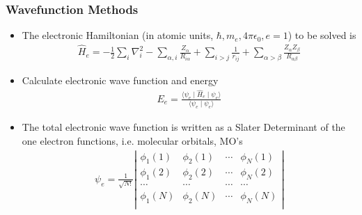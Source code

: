 \documentclass[slidestop,mathserif,compress,xcolor=svgnames]{beamer}
\begin{document}
\begin{frame}
  \frametitle{\small Wavefunction Methods}
  \begin{block}{}
    \begin{itemize}
      \item The electronic Hamiltonian (in atomic units, $\hbar,m_e,4\pi\epsilon_0,e=1$) to be solved is 
      \begin{align*}
	\hat{H}_e = -\frac{1}{2}\sum_i\nabla^2_i - \sum_{\alpha,i}\frac{Z_\alpha}{R_{i\alpha}} + \sum_{i>j}\frac{1}{r_{ij}} + \sum_{\alpha>\beta}\frac{Z_\alpha Z_\beta}{R_{\alpha\beta}}
      \end{align*}
      \item Calculate electronic wave function and energy
      \begin{align*}
	E_e = \frac{\langle\psi_e\mid\hat{H}_e\mid\psi_e\rangle}{\langle\psi_e\mid\psi_e\rangle}
      \end{align*}
      \item The total electronic wave function is written as a Slater Determinant of the one electron functions, i.e. molecular orbitals, MO's
      \begin{align*}
	\psi_e = \frac{1}{\sqrt{N!}}\left| \begin{array}{cccc}
	\phi_1(1) & \phi_2(1) & \cdots & \phi_N(1)\\
	\phi_1(2) & \phi_2(2) & \cdots & \phi_N(2)\\
	\cdots & \cdots & \cdots & \cdots \\
	\phi_1(N) & \phi_2(N) & \cdots & \phi_N(N)\\
	\end{array} \right|
      \end{align*}
    \end{itemize}
  \end{block}
\end{frame}
\end{document}
